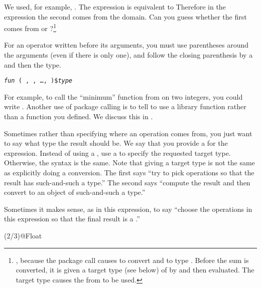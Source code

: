 We used, for example, .
The expression  is equivalent to 
Therefore in the expression
 the second
\spadop{+} comes from the  domain.
Can you guess whether the first \spadop{+} comes from
 or ?\footnote{,
because the package call causes \Language{} to convert
 and  to type .
Before the sum is converted, it is given a target type (see below) of
 by \Language{} and then evaluated.
The target type causes the \spadop{+} from  to be used.}

\beginImportant
For an operator written before its arguments, you must use
parentheses around the arguments (even if there is only one),
and follow the closing parenthesis by a \spadSyntax{$}
and then the type.
\begin{center}
{\tt {\it fun} ( , , \ldots,  )\${\it type}}
\end{center}
\endImportant

For example, to call the ``minimum'' function from 
on two integers, you could write .
Another use of package calling is to tell \Language{} to use a library
function rather than a function you defined.
We discuss this in .

Sometimes rather than specifying where an operation comes from, you just
want to say what type the result should be.
We say that you provide
a
 for the expression.
Instead of using a \spadSyntax{$}, use a  to specify
the requested target type.
Otherwise, the syntax is the same.
Note that giving a target type is not the same as explicitly doing a
conversion.
The first says ``try to pick operations so that the result has
such-and-such a type.''
The second says ``compute the result and then convert to an object of
such-and-such a type.''

\begin{xtc}
\begin{xtccomment}
Sometimes it makes sense, as in this expression,
to say ``choose the operations in this expression so that
the final result is a .''
\end{xtccomment}
\begin{spadsrc}
(2/3)@Float
\end{spadsrc}
\begin{TeXOutput}
\begin{fricasmath}{4}
%
\end{fricasmath}
\end{TeXOutput}
\end{xtc}

